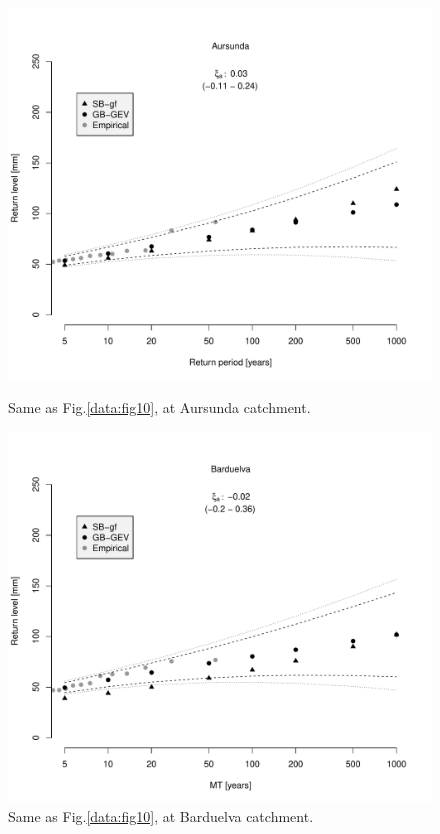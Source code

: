 \documentclass[12pt,a4paper,english]{article}
\begin{document}
\clearpage

\begin{figure}[!htbp]
\begin{minipage}[t]{0.50\textwidth}
\centering
\includegraphics[width = \linewidth]{Figs/compareMT_Aursunda.pdf}
\caption[]{\label{data:fig12}Same as Fig.\ref{data:fig10}, at Aursunda catchment.}
\end{minipage}
\hspace{10mm}
\begin{minipage}[t]{0.50\textwidth}
\centering
\includegraphics[width = \linewidth]{Figs/compareMT_Barduelva.pdf}
\caption[]{\label{data:fig13}Same as Fig.\ref{data:fig10}, at Barduelva catchment.}
\end{minipage}
\end{figure}
\end{document}
